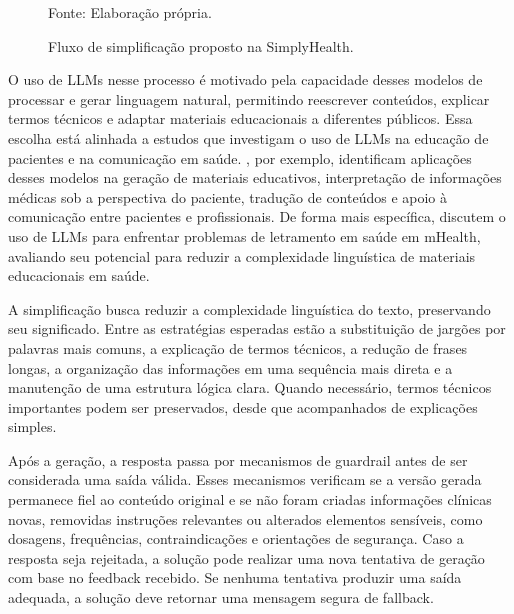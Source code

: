 \begin{figure}[htbp]
{
}
\caption{Fluxo de simplificação proposto na SimplyHealth.}
\label{fig:fluxo-simplificacao-proposto}

{\small Fonte: Elaboração própria.}
\end{figure}


O uso de LLMs nesse processo é motivado pela capacidade desses modelos de processar e gerar linguagem natural, permitindo reescrever conteúdos, explicar termos técnicos e adaptar materiais educacionais a diferentes públicos. Essa escolha está alinhada a estudos que investigam o uso de LLMs na educação de pacientes e na comunicação em saúde. , por exemplo, identificam aplicações desses modelos na geração de materiais educativos, interpretação de informações médicas sob a perspectiva do paciente, tradução de conteúdos e apoio à comunicação entre pacientes e profissionais. De forma mais específica,  discutem o uso de LLMs para enfrentar problemas de letramento em saúde em mHealth, avaliando seu potencial para reduzir a complexidade linguística de materiais educacionais em saúde.

A simplificação busca reduzir a complexidade linguística do texto, preservando seu significado. Entre as estratégias esperadas estão a substituição de jargões por palavras mais comuns, a explicação de termos técnicos, a redução de frases longas, a organização das informações em uma sequência mais direta e a manutenção de uma estrutura lógica clara. Quando necessário, termos técnicos importantes podem ser preservados, desde que acompanhados de explicações simples.

Após a geração, a resposta passa por mecanismos de guardrail antes de ser considerada uma saída válida. Esses mecanismos verificam se a versão gerada permanece fiel ao conteúdo original e se não foram criadas informações clínicas novas, removidas instruções relevantes ou alterados elementos sensíveis, como dosagens, frequências, contraindicações e orientações de segurança. Caso a resposta seja rejeitada, a solução pode realizar uma nova tentativa de geração com base no feedback recebido. Se nenhuma tentativa produzir uma saída adequada, a solução deve retornar uma mensagem segura de fallback.


